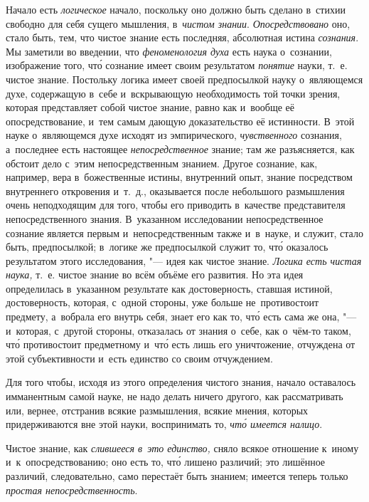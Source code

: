 Начало есть {\em логическое} начало, поскольку оно должно быть сделано в~стихии
свободно для себя сущего мышления, в~{\em чистом знании}. {\em Опосредствовано}
оно, стало быть, тем, что чистое знание есть последняя, абсолютная истина {\em
сознания}. Мы заметили во введении, что {\em феноменология духа} есть наука
о~сознании, изображение того, чт\'{о} сознание имеет своим результатом
{\em понятие} науки, т.~е. чистое знание. Постольку логика имеет своей
предпосылкой науку о~являющемся духе, содержащую в~себе и~вскрывающую
необходимость той точки зрения, которая представляет собой чистое знание, равно
как и~вообще её опосредствование, и~тем самым дающую доказательство её
истинности. В~этой науке о~являющемся духе исходят из эмпирического,
{\em чувственного} сознания, а~последнее есть настоящее {\em непосредственное}
знание; там же разъясняется, как обстоит дело с~этим непосредственным знанием.
Другое сознание, как, например, вера в~божественные истины, внутренний опыт,
знание посредством внутреннего откровения и~т.~д., оказывается после небольшого
размышления очень неподходящим для того, чтобы его приводить в~качестве
представителя непосредственного знания. В~указанном исследовании
непосредственное сознание является первым и~непосредственным также и~в~науке, и
служит, стало быть, предпосылкой; в~логике же предпосылкой служит то, чт\'{о}
оказалось результатом этого исследования, "--- идея как чистое знание.
{\em Логика есть чистая наука,} т.~е. чистое знание во всём объёме его
развития. Но эта идея определилась в~указанном результате как достоверность,
ставшая истиной, достоверность, которая, с~одной стороны, уже больше
не~противостоит предмету, а~вобрала его внутрь себя, знает его как то, чт\'{о}
есть сама же она, "--- и~которая, с~другой стороны, отказалась от знания о~себе, как
о~чём-то таком, чт\'{о} противостоит предметному и~чт\'{о} есть лишь его
уничтожение, отчуждена от этой субъективности и~есть единство
со своим отчуждением.

Для того чтобы, исходя из этого определения чистого знания, начало оставалось
имманентным самой науке, не надо делать ничего другого, как рассматривать или,
вернее, отстранив всякие размышления, всякие мнения, которых придерживаются
вне этой науки, воспринимать то, {\em чт\'{о} имеется налицо}.

Чистое знание, как {\em слившееся в~это единство,} сняло всякое отношение
к~иному и~к~опосредствованию; оно есть то, чт\'{о} лишено различий; это
лишённое различий, следовательно, само перестаёт быть знанием; имеется теперь
только {\em простая непосредственность}.

